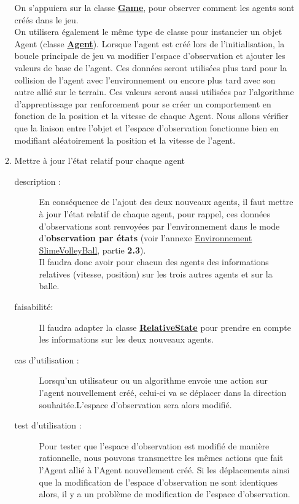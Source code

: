 \documentclass[11pt, a4paper]{article}
\newcommand{\besoinVItem}[5]{
	\item #1
	\begin{description}
		\item[description :]
		#2 
		\item[faisabilité: ]
		#3
		\item[cas d'utilisation :]
		#4
		\item[test d'utilisation :]      
		#5
	\end{description}
}
\begin{document}
\begin{itemize}
\begin{enumerate}
{	}
	{
		On s'appuiera sur la classe \hyperlink{link2}{\textbf{Game}}, pour observer comment les agents sont créés dans le jeu. \\
		On utilisera également le même type de classe pour instancier un objet Agent (classe \hyperlink{link2}{\textbf{Agent}}).
	}
	{
		Lorsque l'agent est créé lors de l'initialisation, la boucle principale de jeu va modifier l'espace d'observation et ajouter les valeurs de base de l'agent. Ces données seront utilisées plus tard pour la collision de l'agent avec l'environnement ou encore plus tard avec son autre allié sur le terrain. Ces valeurs seront aussi utilisées par l'algorithme d'apprentissage par renforcement pour se créer un comportement en fonction de la position et la vitesse de chaque Agent.
	}
	{
		Nous allons vérifier que la liaison entre l'objet et l'espace d'observation fonctionne bien en modifiant aléatoirement la position et la vitesse de l'agent. 	
	} 
	

  \besoinVItem{Mettre à jour l'état relatif pour chaque agent}
	{ 
		En conséquence de l'ajout des deux nouveaux agents, il faut mettre à jour l'état relatif de chaque agent, pour rappel, ces données d'observations sont renvoyées par l'environnement
		dans le mode d'\textbf{observation par états} (voir l'annexe \href{/annexes/Environnement_SlimeVolleyBall.pdf}{Environnement SlimeVolleyBall}, partie \textbf{2.3}).\\
		Il faudra donc avoir pour chacun des agents des informations relatives (vitesse, position) sur les trois autres agents et sur la balle.
	}
	{
  		Il faudra adapter la classe \hyperlink{link2}{\textbf{RelativeState}} pour prendre en compte les informations sur les deux nouveaux agents.

	}
	{
        Lorsqu'un utilisateur ou un algorithme envoie une action sur l'agent nouvellement créé, celui-ci va se déplacer dans la direction souhaitée.L'espace d'observation sera alors modifié.
	}
	{
		Pour tester que l'espace d'observation est modifié de manière rationnelle, nous pouvons transmettre les mêmes actions que fait l'Agent allié à l'Agent nouvellement créé. Si les déplacements ainsi que la modification de l'espace d'observation ne sont identiques alors, il y a un problème de modification de l'espace d'observation.
	}



\end{enumerate}
\end{itemize}
\end{document}

